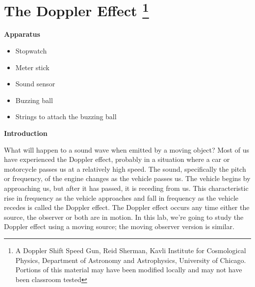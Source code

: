 \section{The Doppler Effect \footnote{A Doppler Shift Speed Gun, Reid Sherman, Kavli Institute for Cosmological Physics, Department of Astronomy and Astrophysics, University of Chicago. Portions of this material may have been modified locally and may not have been classroom tested}}

\makelabheader %

\vspace{0.1in}
%

\textbf{Apparatus} 

\begin{itemize}
	\item Stopwatch
	\item Meter stick
	\item Sound sensor
	\item Buzzing ball
	\item Strings to attach the buzzing ball
\end{itemize}
\vspace{0.3cm}

\textbf{Introduction}

What will happen to a sound wave when emitted by a moving object? Most of us have experienced the Doppler effect, probably in a situation where a car or motorcycle passes us at a relatively high speed. The sound, specifically the pitch or frequency, of the engine changes as the vehicle passes us. The vehicle begins by approaching us, but after it has passed, it is receding from us. This characteristic rise in frequency as the vehicle approaches and fall in frequency as the vehicle recedes is called the Doppler effect.  The Doppler effect occurs any time either the source, the observer or both are in motion.  In this lab, we're going to study the Doppler effect using a moving source; the moving observer version is similar.
\vspace{0.3cm}

